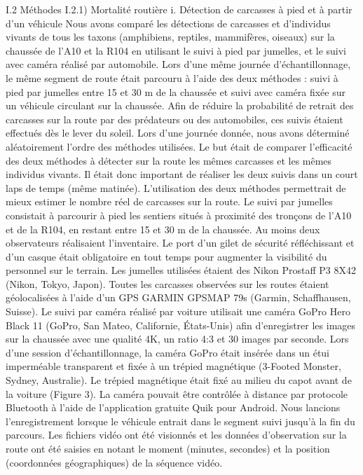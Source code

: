 


I.2 Méthodes
I.2.1) Mortalité routière
i. Détection de carcasses à pied et à partir d'un véhicule
Nous avons comparé les détections de carcasses et d'individus vivants de tous les taxons (amphibiens, reptiles, mammifères, oiseaux) sur la chaussée de l'A10 et la R104 en utilisant le suivi à pied par jumelles, et le suivi avec caméra réalisé par automobile. Lors d'une même journée d'échantillonnage, le même segment de route était parcouru à l'aide des deux méthodes : suivi à pied par jumelles entre 15 et 30 m de la chaussée et suivi avec caméra fixée sur un véhicule circulant sur la chaussée. Afin de réduire la probabilité de retrait des carcasses sur la route par des prédateurs ou des automobiles, ces suivis étaient effectués dès le lever du soleil. Lors d'une journée donnée, nous avons déterminé aléatoirement l’ordre des méthodes utilisées. Le but était de comparer l'efficacité des deux méthodes à détecter sur la route les mêmes carcasses et les mêmes individus vivants. Il était donc important de réaliser les deux suivis dans un court laps de temps (même matinée). L’utilisation des deux méthodes permettrait de mieux estimer le nombre réel de carcasses sur la route.
Le suivi par jumelles consistait à parcourir à pied les sentiers situés à proximité des tronçons de l'A10 et de la R104, en restant entre 15 et 30 m de la chaussée. Au moins deux observateurs réalisaient l'inventaire. Le port d'un gilet de sécurité réfléchissant et d'un casque était obligatoire en tout temps pour augmenter la visibilité du personnel sur le terrain. Les jumelles utilisées étaient des Nikon Prostaff P3 8X42 (Nikon, Tokyo, Japon). Toutes les carcasses observées sur les routes étaient géolocalisées à l'aide d'un GPS GARMIN GPSMAP 79s (Garmin, Schaffhausen, Suisse). Le suivi par caméra réalisé par voiture utilisait une caméra GoPro Hero Black 11 (GoPro, San Mateo, Californie, États-Unis) afin d'enregistrer les images sur la chaussée avec une qualité 4K, un ratio 4:3 et 30 images par seconde. Lors d'une session d'échantillonnage, la caméra GoPro était insérée dans un étui imperméable transparent et fixée à un trépied magnétique (3-Footed Monster, Sydney, Australie). Le trépied magnétique était fixé au milieu du capot avant de la voiture (Figure 3). La caméra pouvait être contrôlée à distance par protocole Bluetooth à l'aide de l'application gratuite Quik pour Android. Nous lancions l'enregistrement lorsque le véhicule entrait dans le segment suivi jusqu'à la fin du parcours. Les fichiers vidéo ont été visionnés et les données d'observation sur la route ont été saisies en notant le moment (minutes, secondes) et la position (coordonnées géographiques) de la séquence vidéo.